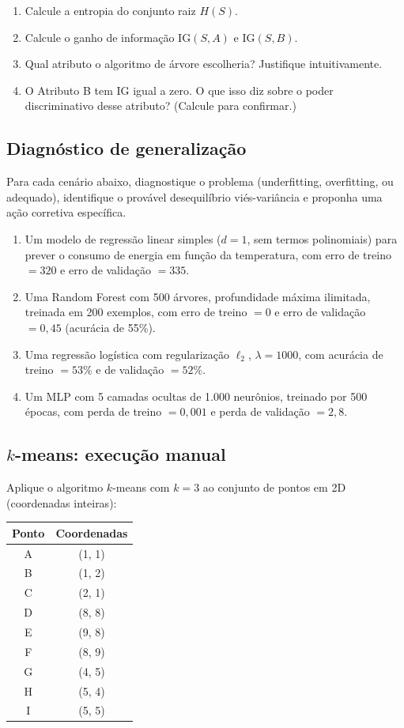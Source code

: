 \documentclass[12pt,a4paper]{article}
\begin{document}
\begin{enumerate}[label=(\alph*)]
    \item Calcule a entropia do conjunto raiz $H(S)$.
    \item Calcule o ganho de informação $\text{IG}(S, A)$ e $\text{IG}(S, B)$.
    \item Qual atributo o algoritmo de árvore escolheria? Justifique intuitivamente.
    \item O Atributo B tem IG igual a zero. O que isso diz sobre o poder discriminativo desse atributo? (Calcule para confirmar.)
\end{enumerate}

\subsection{Diagnóstico de generalização}

Para cada cenário abaixo, diagnostique o problema (underfitting, overfitting, ou adequado), identifique o provável desequilíbrio viés-variância e proponha uma ação corretiva específica.

\begin{enumerate}[label=(\alph*)]
    \item Um modelo de regressão linear simples ($d=1$, sem termos polinomiais) para prever o consumo de energia em função da temperatura, com erro de treino $= 320$ e erro de validação $= 335$.
    \item Uma Random Forest com 500 árvores, profundidade máxima ilimitada, treinada em 200 exemplos, com erro de treino $= 0$ e erro de validação $= 0{,}45$ (acurácia de 55\%).
    \item Uma regressão logística com regularização $\ell_2$, $\lambda = 1000$, com acurácia de treino $= 53\%$ e de validação $= 52\%$.
    \item Um MLP com 5 camadas ocultas de 1.000 neurônios, treinado por 500 épocas, com perda de treino $= 0{,}001$ e perda de validação $= 2{,}8$.
\end{enumerate}

\subsection{\texorpdfstring{$k$}{k}-means: execução manual}

Aplique o algoritmo $k$-means com $k=3$ ao conjunto de pontos em 2D (coordenadas inteiras):

\medskip
\begin{center}
\begin{tabular}{cc}
\toprule
Ponto & Coordenadas \\
\midrule
A & (1, 1) \\ B & (1, 2) \\ C & (2, 1) \\
D & (8, 8) \\ E & (9, 8) \\ F & (8, 9) \\
G & (4, 5) \\ H & (5, 4) \\ I & (5, 5) \\
\bottomrule
\end{tabular}
\end{center}
\end{document}
